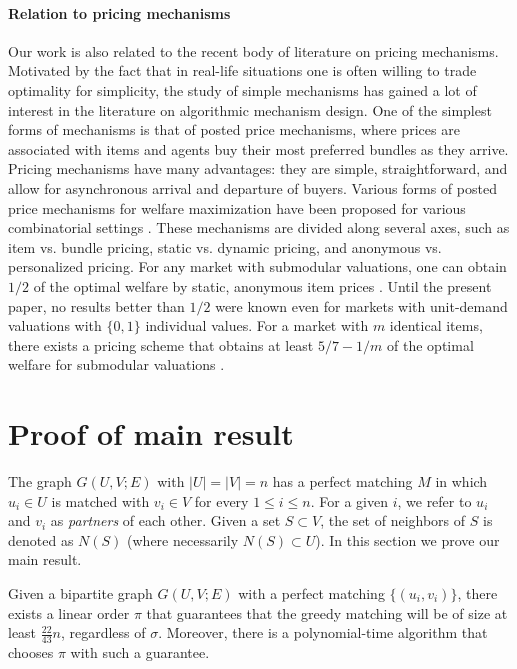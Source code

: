 \documentclass{toc}
\theoremstyle{plain}
\begin{document}
\paragraph*{Relation to pricing mechanisms}
Our work is also related to the recent body of literature on pricing mechanisms.
Motivated by the fact that in real-life situations one is often willing to trade optimality for simplicity, the study of simple mechanisms has gained a lot of interest in the literature on algorithmic mechanism design.
One of the simplest forms of mechanisms is that of posted price mechanisms, where prices are associated with items and agents buy their most preferred bundles as they arrive.
Pricing mechanisms have many advantages: they are simple, straightforward, and allow for asynchronous arrival and departure of buyers. %
Various forms of posted price mechanisms for welfare maximization have been proposed for various combinatorial settings \cite{FeldmanGL15,DuttingFKL16,Lucier17,EzraFRS20}. These mechanisms are divided along several axes, such as item vs. bundle pricing, static vs. dynamic pricing, and anonymous vs. personalized pricing.
For any market with submodular valuations, one can obtain $1/2$ of the optimal welfare by static, anonymous item prices \cite{FeldmanGL15}.
Until the present paper, no %
results better than  %
$1/2$ were known even for markets with unit-demand valuations with $\{0,1\}$ individual values.
For a market with $m$ identical items, there exists a pricing scheme that obtains at least $5/7-1/m$ of the optimal welfare for submodular valuations \cite{EzraFRS20}.






\section{Proof of main result}
\label{sec:main-result}

The graph $G(U,V;E)$ with $|U| = |V| = n$ has a perfect matching $M$ in which $u_i \in U$ is matched with $v_i \in V$ for every $1 \le i \le n$. For a given $i$, we refer to $u_i$ and $v_i$ as \emph{partners} of each other. Given a set $S \subset V$, the set of neighbors of $S$ is denoted  as $N(S)$ (where necessarily $N(S) \subset U$).
%
In this section we prove our main result.

\begin{theorem}
	\label{thm:86}
	Given a bipartite graph $G(U,V;E)$ with a perfect matching $\{(u_i,v_i)\}$, there exists a linear order $\pi$ that guarantees that the greedy matching will be of size at least $\frac{22}{43}n$, regardless of $\sigma$. Moreover, there is a polynomial-time algorithm that chooses $\pi$ with such a guarantee.
\end{theorem}
\end{document}
